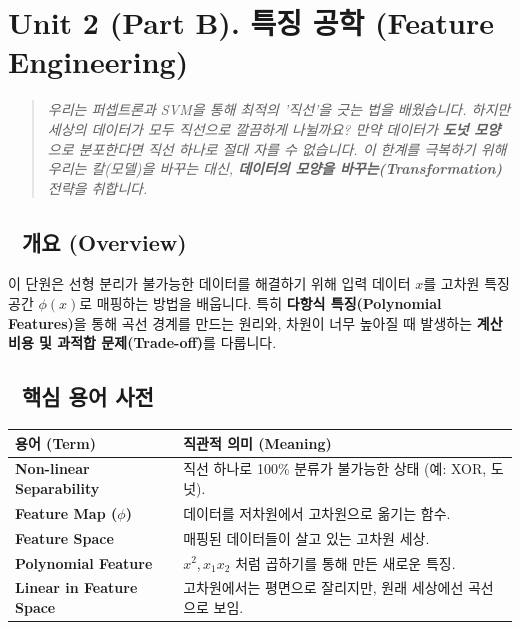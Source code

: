 \documentclass[11pt,a4paper]{book}
\theoremstyle{definition}
\begin{document}
\section{Unit 2 (Part B). 특징 공학 (Feature Engineering)}

\begin{quote}
\textit{우리는 퍼셉트론과 SVM을 통해 최적의 '직선'을 긋는 법을 배웠습니다. 하지만 세상의 데이터가 모두 직선으로 깔끔하게 나뉠까요? 만약 데이터가 \textbf{도넛 모양}으로 분포한다면 직선 하나로 절대 자를 수 없습니다. 이 한계를 극복하기 위해 우리는 칼(모델)을 바꾸는 대신, \textbf{데이터의 모양을 바꾸는(Transformation)} 전략을 취합니다.}
\end{quote}

\subsection*{📌 개요 (Overview)}
이 단원은 선형 분리가 불가능한 데이터를 해결하기 위해 입력 데이터 $x$를 고차원 특징 공간 $\phi(x)$로 매핑하는 방법을 배웁니다. 특히 \textbf{다항식 특징(Polynomial Features)}을 통해 곡선 경계를 만드는 원리와, 차원이 너무 높아질 때 발생하는 \textbf{계산 비용 및 과적합 문제(Trade-off)}를 다룹니다.

\subsection*{📝 핵심 용어 사전}
\begin{table}[h]
\centering
\begin{tabularx}{\textwidth}{|p{}|X|}
\hline
\textbf{용어 (Term)} & \textbf{직관적 의미 (Meaning)} \\
\hline
\textbf{Non-linear Separability} & 직선 하나로 100\% 분류가 불가능한 상태 (예: XOR, 도넛). \\
\hline
\textbf{Feature Map ($\phi$)} & 데이터를 저차원에서 고차원으로 옮기는 함수. \\
\hline
\textbf{Feature Space} & 매핑된 데이터들이 살고 있는 고차원 세상. \\
\hline
\textbf{Polynomial Feature} & $x^2, x_1 x_2$ 처럼 곱하기를 통해 만든 새로운 특징. \\
\hline
\textbf{Linear in Feature Space} & 고차원에서는 평면으로 잘리지만, 원래 세상에선 곡선으로 보임. \\
\hline
\end{tabularx}
\end{table}
\end{document}
